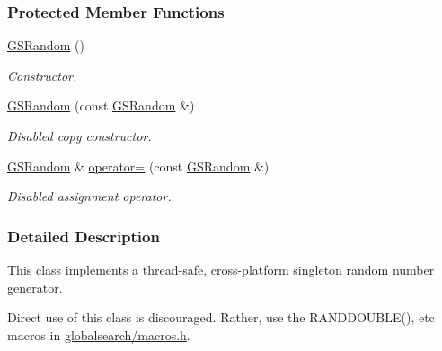 \subsubsection*{Protected Member Functions}
\begin{DoxyCompactItemize}
\item 
\hypertarget{classGlobalSearch_1_1GSRandom_a87c1478f68605a85be05376799898185}{}\hyperlink{classGlobalSearch_1_1GSRandom_a87c1478f68605a85be05376799898185}{G\+S\+Random} ()\label{classGlobalSearch_1_1GSRandom_a87c1478f68605a85be05376799898185}

\begin{DoxyCompactList}\small\item\em Constructor. \end{DoxyCompactList}\item 
\hypertarget{classGlobalSearch_1_1GSRandom_a43fb2fb498f272c8150e59e58ca8ce37}{}\hyperlink{classGlobalSearch_1_1GSRandom_a43fb2fb498f272c8150e59e58ca8ce37}{G\+S\+Random} (const \hyperlink{classGlobalSearch_1_1GSRandom}{G\+S\+Random} \&)\label{classGlobalSearch_1_1GSRandom_a43fb2fb498f272c8150e59e58ca8ce37}

\begin{DoxyCompactList}\small\item\em Disabled copy constructor. \end{DoxyCompactList}\item 
\hypertarget{classGlobalSearch_1_1GSRandom_ac4d2afd7e581d4d3daa9def13f34f11a}{}\hyperlink{classGlobalSearch_1_1GSRandom}{G\+S\+Random} \& \hyperlink{classGlobalSearch_1_1GSRandom_ac4d2afd7e581d4d3daa9def13f34f11a}{operator=} (const \hyperlink{classGlobalSearch_1_1GSRandom}{G\+S\+Random} \&)\label{classGlobalSearch_1_1GSRandom_ac4d2afd7e581d4d3daa9def13f34f11a}

\begin{DoxyCompactList}\small\item\em Disabled assignment operator. \end{DoxyCompactList}\end{DoxyCompactItemize}


\subsubsection{Detailed Description}
This class implements a thread-\/safe, cross-\/platform singleton random number generator. 

Direct use of this class is discouraged. Rather, use the R\+A\+N\+D\+D\+O\+U\+B\+L\+E(), etc macros in \hyperlink{macros_8h_source}{globalsearch/macros.\+h}.

